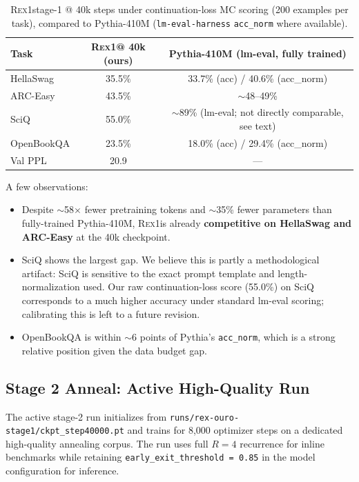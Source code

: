 \documentclass[11pt,a4paper]{article}
\newcommand{\REX}{\textsc{Rex1}\xspace}
\providecommand{\xspace}{}
\begin{document}
\begin{table}[h]
  \centering
  \caption{\REX stage-1 @ 40k steps under continuation-loss MC scoring
  (200 examples per task), compared to Pythia-410M
  (\texttt{lm-eval-harness} \texttt{acc\_norm} where available).}
  \label{tab:stage1-40k}
  \begin{tabular}{lcc}
    \toprule
    Task & \REX @ 40k (ours) & Pythia-410M (lm-eval, fully trained) \\
    \midrule
    HellaSwag & 35.5\% & 33.7\% (acc) / 40.6\% (acc\_norm) \\
    ARC-Easy & 43.5\% & $\sim$48--49\% \\
    SciQ & 55.0\% & $\sim$89\% (lm-eval; not directly comparable, see text) \\
    OpenBookQA & 23.5\% & 18.0\% (acc) / 29.4\% (acc\_norm) \\
    Val PPL & 20.9 & --- \\
    \bottomrule
  \end{tabular}
\end{table}

A few observations:

\begin{itemize}[leftmargin=*]
  \item Despite $\sim$58$\times$ fewer pretraining tokens and $\sim$35\%
    fewer parameters than fully-trained Pythia-410M, \REX is already
    \textbf{competitive on HellaSwag and ARC-Easy} at the 40k checkpoint.
  \item SciQ shows the largest gap. We believe this is partly a
    methodological artifact: SciQ is sensitive to the exact prompt template
    and length-normalization used. Our raw continuation-loss
    score (55.0\%) on SciQ corresponds to a much higher accuracy under
    standard lm-eval scoring; calibrating this is left to a future revision.
  \item OpenBookQA is within $\sim$6 points of Pythia's \texttt{acc\_norm},
    which is a strong relative position given the data budget gap.
\end{itemize}

\subsection{Stage 2 Anneal: Active High-Quality Run}

The active stage-2 run initializes from
\texttt{runs/rex-ouro-stage1/ckpt\_step40000.pt} and trains for 8{,}000
optimizer steps on a dedicated high-quality annealing corpus. The run uses
full $R=4$ recurrence for inline benchmarks while retaining
\texttt{early\_exit\_threshold = 0.85} in the model configuration for inference.
\end{document}
